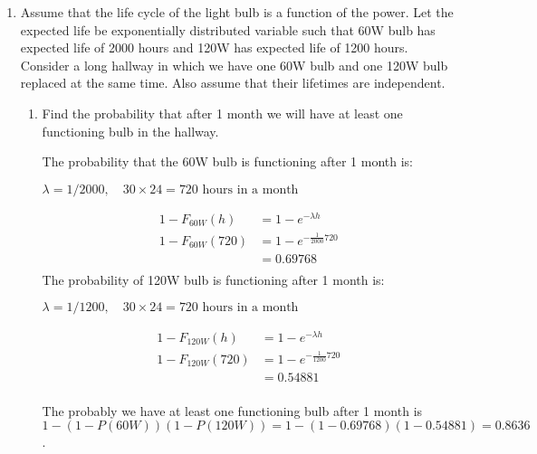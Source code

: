 \documentclass[12pt]{article}
\begin{document}
\begin{enumerate}
    
    
    \item Assume that the life cycle of the light bulb is a function of the power. Let the expected life be exponentially distributed variable such that 60W bulb has expected life of 2000 hours and 120W has expected life of 1200 hours. Consider a long hallway in which we have one 60W bulb and one 120W bulb replaced at the same time. Also assume that their lifetimes are independent.
    \begin{enumerate}
        \item Find the probability that after 1 month we will have at least one functioning bulb in the hallway.
        
        The probability that the 60W bulb is functioning after 1 month is:
        
        \begin{center}
            $\lambda = 1/2000, \quad \text{$30 \times 24 = 720$ hours in a month}$
        \end{center}
        \begin{equation*}
            \begin{aligned}
            1 -F_{60W}(h) &= 1 - e^{-\lambda h} \\
            1 - F_{60W}(720) &= 1 - e^{-\frac{1}{2000}720} \\
            &= 0.69768 \\
            \end{aligned}
        \end{equation*}
        The probability of 120W bulb is functioning after 1 month is:

        \begin{center}
            $\lambda = 1/1200, \quad \text{$30 \times 24 = 720$ hours in a month}$
        \end{center}
        \begin{equation*}
            \begin{aligned}
            1 - F_{120W}(h) &= 1 - e^{-\lambda h} \\
            1 - F_{120W}(720) &= 1 - e^{-\frac{1}{1200}720} \\
            &= 0.54881 \\
            \end{aligned}
        \end{equation*}
        
        The probably we have at least one functioning bulb after 1 month is $1-(1-P(60W))(1-P(120W)) = 1 - (1-0.69768)(1-0.54881) =  0.8636$.


\end{enumerate}
\end{enumerate}
\end{document}
